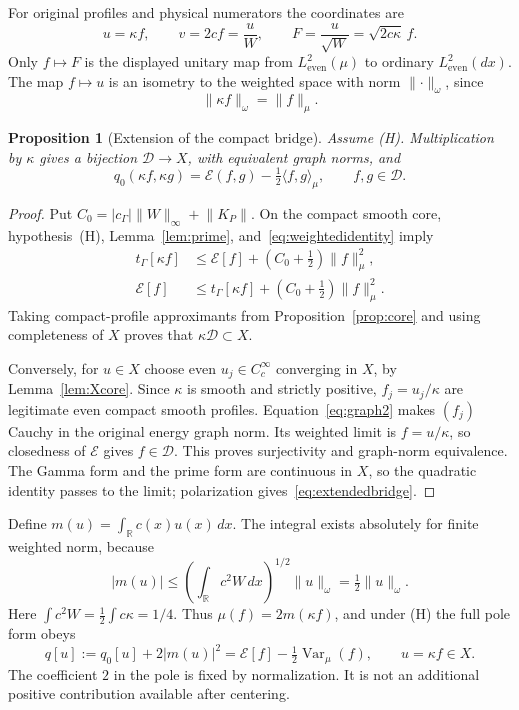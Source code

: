 \documentclass[11pt,a4paper]{article}
\numberwithin{equation}{section}
\newtheorem{proposition}[theorem]{Proposition}
\theoremstyle{definition}
\theoremstyle{remark}
\newcommand{\R}{\mathbb R}
\newcommand{\E}{\mathcal E}
\newcommand{\D}{\mathcal D}
\newcommand{\He}{L^2_{\mathrm{even}}(\mu)}
\newcommand{\Le}{L^2_{\mathrm{even}}(dx)}
\newcommand{\tg}{t_{\Gamma}}
\newcommand{\cg}{c_{\Gamma}}
\newcommand{\Var}{\operatorname{Var}}
\newcommand{\ip}[2]{\langle #1,#2\rangle}
\newcommand{\norm}[1]{\lVert #1\rVert}
\begin{document}
For original profiles and physical numerators the coordinates are
\begin{equation}\label{eq:coordinates}
 u=\kappa f,\qquad v=2cf=\frac uW,\qquad
 F=\frac u{\sqrt W}=\sqrt{2c\kappa}\,f.
\end{equation}
Only $f\mapsto F$ is the displayed unitary map from $\He$ to ordinary $\Le$. The map $f\mapsto u$ is an isometry to the weighted space with norm $\norm{\cdot}_\omega$, since
\begin{equation}\label{eq:weightedidentity}
 \norm{\kappa f}_\omega=\norm{f}_\mu.
\end{equation}

\begin{proposition}[Extension of the compact bridge]\label{prop:domain}
Assume \textup{(H)}. Multiplication by $\kappa$ gives a bijection $\D\to X$, with equivalent graph norms, and
\begin{equation}\label{eq:extendedbridge}
 q_0(\kappa f,\kappa g)=\E(f,g)-\tfrac12\ip{f}{g}_\mu,
 \qquad f,g\in\D.
\end{equation}
\end{proposition}
\begin{proof}
Put $C_0=|\cg|\norm{W}_\infty+\norm{K_P}$. On the compact smooth core, hypothesis~(H), Lemma~\ref{lem:prime}, and~\eqref{eq:weightedidentity} imply
\begin{align}
 \tg[\kappa f]&\le\E[f]+(C_0+\tfrac12)\norm{f}_\mu^2,\label{eq:graph1}\\
 \E[f]&\le\tg[\kappa f]+(C_0+\tfrac12)\norm{f}_\mu^2.\label{eq:graph2}
\end{align}
Taking compact-profile approximants from Proposition~\ref{prop:core} and using completeness of $X$ proves that $\kappa\D\subset X$.

Conversely, for $u\in X$ choose even $u_j\in C_c^\infty$ converging in $X$, by Lemma~\ref{lem:Xcore}. Since $\kappa$ is smooth and strictly positive, $f_j=u_j/\kappa$ are legitimate even compact smooth profiles. Equation~\eqref{eq:graph2} makes $(f_j)$ Cauchy in the original energy graph norm. Its weighted limit is $f=u/\kappa$, so closedness of $\E$ gives $f\in\D$. This proves surjectivity and graph-norm equivalence. The Gamma form and the prime form are continuous in $X$, so the quadratic identity passes to the limit; polarization gives~\eqref{eq:extendedbridge}.
\end{proof}

Define $m(u)=\int_\R c(x)u(x)\,dx$. The integral exists absolutely for finite weighted norm, because
\begin{equation}\label{eq:meanbound}
 |m(u)|\le\left(\int_\R c^2W\,dx\right)^{1/2}\norm{u}_\omega
       =\tfrac12\norm{u}_\omega.
\end{equation}
Here $\int c^2W=\tfrac12\int c\kappa=1/4$. Thus $\mu(f)=2m(\kappa f)$, and under (H) the full pole form obeys
\begin{equation}\label{eq:polebridge}
 q[u]:=q_0[u]+2|m(u)|^2
       =\E[f]-\tfrac12\Var_\mu(f),\qquad u=\kappa f\in X.
\end{equation}
The coefficient $2$ in the pole is fixed by normalization. It is not an additional positive contribution available after centering.
\end{document}
